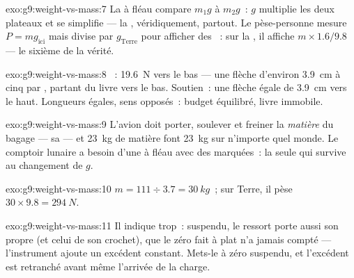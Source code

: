 \begin{solution}{exo:g9:weight-vs-mass:7}
La  à fléau compare $m_1 g$ à $m_2 g$~: $g$ multiplie les deux
plateaux et se simplifie --- la , véridiquement, partout. Le
pèse-personne mesure $P = m g_{\text{ici}}$ mais divise par
$g_{\text{Terre}}$ pour afficher des ~: sur la , il
affiche $m \times 1.6/9.8$ --- le sixième de la vérité.
\end{solution}

\begin{solution}{exo:g9:weight-vs-mass:8}
~: \qty{19.6}{N} vers le bas --- une flèche d'environ
\qty{3.9}{cm} à cinq  par , partant du livre vers le
bas. Soutien~: une flèche égale de \qty{3.9}{cm} vers le haut.
Longueurs égales, sens opposés~: budget équilibré, livre immobile.
\end{solution}

\begin{solution}{exo:g9:weight-vs-mass:9}
L'avion doit porter, soulever et freiner la \emph{matière} du bagage
--- sa  --- et \qty{23}{kg} de matière font \qty{23}{kg} sur
n'importe quel monde. Le comptoir lunaire a besoin d'une  à
fléau avec des  marquées~: la seule qui survive au changement de
$g$.
\end{solution}

\begin{solution}{exo:g9:weight-vs-mass:10}
$m = 111 \div 3.7 = \qty{30}{kg}$~; sur Terre, il pèse
$30 \times 9.8 = \qty{294}{N}$.
\end{solution}

\begin{solution}{exo:g9:weight-vs-mass:11}
Il indique trop~: suspendu, le ressort porte aussi son propre 
(et celui de son crochet), que le zéro fait à plat n'a jamais compté
--- l'instrument ajoute un excédent constant. Mets-le à zéro suspendu,
et l'excédent est retranché avant même l'arrivée de la charge.
\end{solution}

